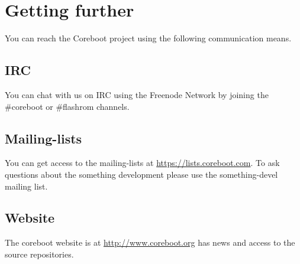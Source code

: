 %
%
%

\chapter*{Getting further}

You can reach the Coreboot project using the following communication means.

\section{IRC}

You can chat with us on IRC using the Freenode Network by joining the
\mbox{\#coreboot} or \mbox{\#flashrom} channels.

\section{Mailing-lists}

You can get access to the mailing-lists at
\url{https://lists.coreboot.com}. To ask questions about the
\mbox{something} development please use the \mbox{something-devel} mailing
list.

\section{Website}

The \mbox{coreboot} website is at \url{http://www.coreboot.org} has news and
access to the source repositories.
